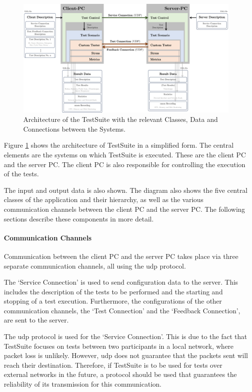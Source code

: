 \begin{figure}
    \centering
    \includegraphics[width=1\linewidth]{figures/method/swdesign2.pdf}
    \caption[Architecture of the TestSuite with the relevant Classes, Data and Connections between the Systems]{Architecture of the TestSuite with the relevant Classes, Data and Connections between the Systems.}
    \label{fig:tsarch}
\end{figure}

Figure \ref{fig:tsarch} shows the architecture of TestSuite in a simplified form. The central elements are the systems on which TestSuite is executed. These are the client PC and the server PC. The client PC is also responsible for controlling the execution of the tests.

The input and output data is also shown. The diagram also shows the five central classes of the application and their hierarchy, as well as the various communication channels between the client PC and the server PC. The following sections describe these components in more detail.

\paragraph{Communication Channels}
Communication between the client PC and the server PC takes place via three separate communication channels, all using the \ac{udp} protocol.

The `Service Connection' is used to send configuration data to the server. This includes the description of the tests to be performed and the starting and stopping of a test execution. Furthermore, the configurations of the other communication channels, the `Test Connection' and the `Feedback Connection', are sent to the server.

The \ac{udp} protocol is used for the `Service Connection'. This is due to the fact that TestSuite focuses on tests between two participants in a local network, where packet loss is unlikely. However, \ac{udp} does not guarantee that the packets sent will reach their destination. Therefore, if TestSuite is to be used for tests over external networks in the future, a protocol should be used that guarantees the reliability of its transmission for this communication.

